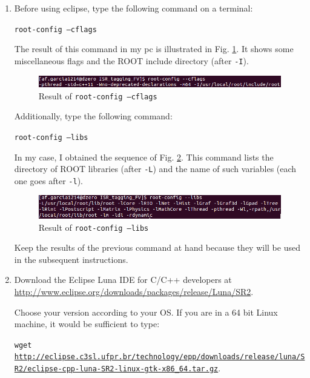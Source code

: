 \documentclass[12pt, oneside]{book}              %
\begin{document}
\begin{enumerate}

\item Before using eclipse, type the following command on a terminal:

\texttt{root-config --cflags}

The result of this command in my pc is illustrated in Fig. \ref{fig:root_cflags}.
It shows some miscellaneous flags and the ROOT include directory (after \texttt{-I}).

\begin{figure}[h!]
	\centering
	\includegraphics[width=0.9\linewidth]{Imags_Doc/root_cflags}
	\caption[Result of \texttt{root-config --cflags}]{Result of \texttt{root-config --cflags}}
	\label{fig:root_cflags}
\end{figure}

Additionally, type the following command:

\texttt{root-config --libs}

In my case, I obtained the sequence of Fig. \ref{fig:root_libs}. This command lists
the directory of ROOT libraries (after \texttt{-L}) and the name of such variables
(each one goes after \texttt{-l}).

\begin{figure}[h!]
	\centering
	\includegraphics[width=0.9\linewidth]{Imags_Doc/root_libs}
	\caption[Result of \texttt{root-config --libs}]{Result of \texttt{root-config --libs}}
	\label{fig:root_libs}
\end{figure}

Keep the results of the previous command at hand because they will be used in the
subsequent instructions.
	
\item Download the Eclipse Luna IDE for C/C++ developers at \url{http://www.eclipse.org/downloads/packages/release/Luna/SR2}. 

Choose your version according to your OS. If you are in a 64 bit Linux machine, 
it would be sufficient to type:

\texttt{wget \url{http://eclipse.c3sl.ufpr.br/technology/epp/downloads/release/luna/SR2/eclipse-cpp-luna-SR2-linux-gtk-x86_64.tar.gz}}.


\end{enumerate}
\end{document}
